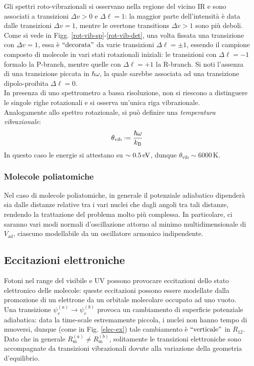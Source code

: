 Gli spettri roto-vibrazionali si osservano nella regione del vicino IR e sono associati a transizioni $ \Delta v > 0 $ e $ \Delta \ell = 1 $: la maggior parte dell'intensità è data dalle transizioni $ \Delta v = 1 $, mentre le overtone transitions $ \Delta v > 1 $ sono più deboli. \\
Come si vede in Figg. \ref{rot-vib-sp}-\ref{rot-vib-det}, una volta fissata una transizione con $ \Delta v = 1 $, essa è $ ``\text{decorata}" $ da varie transizioni $ \Delta \ell = \pm 1 $, essendo il campione composto di molecole in vari stati rotazionali iniziali: le transizioni con $ \Delta \ell = -1 $ formalo la P-branch, mentre quelle con $ \Delta \ell = +1 $ la R-branch. Si noti l'assenza di una transizione piccata in $ \hbar \omega $, la quale sarebbe associata ad una transizione dipolo-proibita $ \Delta \ell = 0 $. \\
In presenza di uno spettrometro a bassa risoluzione, non si riescono a distinguere le singole righe rotazionali e si osserva un'unica riga vibrazionale. \\
Analogamente allo spettro rotazionale, si può definire una \textit{temperatura vibrazionale}:
\begin{equation}
	\theta_\text{vib} \defeq \frac{\hbar \omega}{k_\text{B}}
\end{equation}
In questo caso le energie si attestano su $ \sim 0.5\,\mathrm{eV} $, dunque $ \theta_\text{vib} \sim 6000 \,\text{K} $.

\subsubsection{Molecole poliatomiche}

Nel caso di molecole poliatomiche, in generale il potenziale adiabatico dipenderà sia dalle distanze relative tra i vari nuclei che dagli angoli tra tali distanze, rendendo la trattazione del problema molto più complessa. In particolare, ci saranno vari modi normali d'oscillazione attorno al minimo multidimensionale di $ V_\text{ad} $, ciascuno modellabile da un oscillatore armonico indipendente.

\subsection{Eccitazioni elettroniche}

Fotoni nel range del visibile e UV possono provocare eccitazioni dello stato elettronico delle molecole: queste eccitazioni possono essere modellate dalla promozione di un elettrone da un orbitale molecolare occupato ad uno vuoto. Una transizione $ \psi_e^{(a)} \rightarrow \psi_e^{(b)} $ provoca un cambiamento di superficie potenziale adiabatica: data la time-scale estremamente piccola, i nuclei non hanno tempo di muoversi, dunque (come in Fig. \ref{elec-ex}) tale cambiamento è $ ``\text{verticale}" $ in $ R_{12} $. Dato che in generale $ R_\text{m}^{(a)} \neq R_\text{m}^{(b)} $, solitamente le transizioni elettroniche sono accompagnate da transizioni vibrazionali dovute alla variazione della geometria d'equilibrio.

